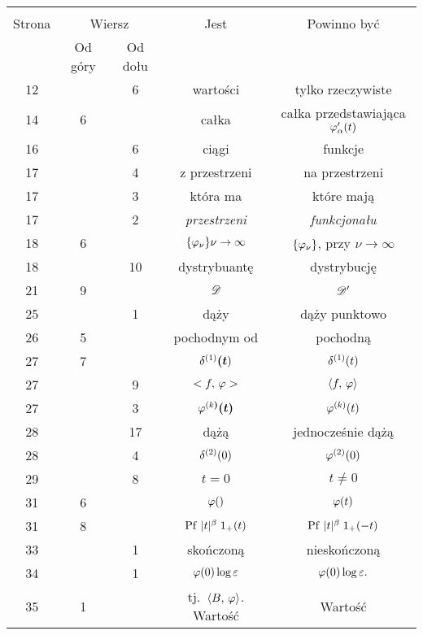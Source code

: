 \documentclass[a4paper,11pt]{article}
\begin{document}
\newpage
{}
\begin{center}
  \begin{tabular}{|c|c|c|c|c|}
    \hline
    & \multicolumn{2}{c|}{} & & \\
    Strona & \multicolumn{2}{c|}{Wiersz}& Jest & Powinno być \\ \cline{2-3}
    & Od góry & Od dołu &  &  \\ \hline
    12  & &  6 & wartości & tylko rzeczywiste \\
    14  &  6 & & całka & całka przedstawiająca $\varphi_{ \alpha }'( t )$ \\
    16  & &  6 & ciągi & funkcje \\
    17  & &  4 & z przestrzeni & na przestrzeni \\
    17  & &  3 & która ma & które mają \\
    17  & &  2 & \emph{przestrzeni} & \emph{funkcjonału} \\
    18  &  6 & & $\{ \varphi_{ \nu } \}\nu \to \infty$ & $\{ \varphi_{ \nu } \}$,
                                                     przy $\nu \to \infty$ \\
    18  & & 10 & dystrybuantę & dystrybucję \\
    21  &  9 & & $\mathcal{D}$ & $\mathcal{D}'$ \\
    25  & &  1 & dąży & dąży punktowo \\
    26  &  5 & & pochodnym od & pochodną \\
    27  &  7 & & $\delta^{ ( 1 ) }\boldsymbol{ ( t } )$ & $\delta^{ ( 1 ) }( t )$ \\
    27  & &  9 & $< f,\, \varphi >$ & $\langle  f ,\,  \varphi  \rangle$ \\
    27  & &  3 & $\varphi^{ ( k \boldsymbol{ ) } }\boldsymbol{ ( t ) } $
           & $\varphi^{ ( k ) }( t )$ \\
    28  & & 17 & dążą & jednocześnie dążą \\
    28  & &  4 & $\delta^{ ( 2 ) }( 0 )$ & $\varphi^{ ( 2 ) }( 0 )$ \\
    29  & &  8 & $t = 0$ & $t \neq 0$ \\
    31  &  6 & & $\varphi( )$ & $\varphi( t )$ \\
    31  &  8 & & $\mathrm{Pf}\, \, | t |^{ \beta } \; 1_{ + }( t )$
           & $\mathrm{Pf}\, \, | t |^{ \beta } \; 1_{ + }( -t )$ \\
    33  & &  1 & skończoną & nieskończoną \\
    34  & &  1 & $\varphi( 0 ) \log\varepsilon$ & $\varphi( 0 ) \log\varepsilon.$ \\
    35  &  1 & & tj.~$\langle  B ,\,  \varphi  \rangle$. Wartość & Wartość \\

\end{tabular}
\end{center}
\end{document}
